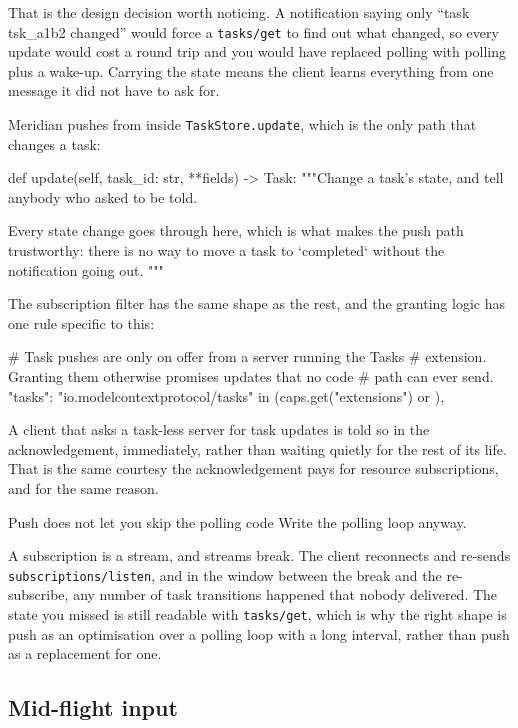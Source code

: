 That is the design decision worth noticing. A notification saying only ``task
tsk\_a1b2 changed'' would force a \texttt{tasks/get} to find out what changed,
so every update would cost a round trip and you would have replaced polling with
polling plus a wake-up. Carrying the state means the client learns everything
from one message it did not have to ask for.

Meridian pushes from inside \texttt{TaskStore.update}, which is the only path
that changes a task:

\begin{py}
def update(self, task_id: str, **fields) -> Task:
    """Change a task's state, and tell anybody who asked to be told.

    Every state change goes through here, which is what makes the push
    path trustworthy: there is no way to move a task to `completed` without
    the notification going out.
    """
\end{py}

The subscription filter has the same shape as the rest, and the granting logic
has one rule specific to this:

\begin{py}
# Task pushes are only on offer from a server running the Tasks
# extension. Granting them otherwise promises updates that no code
# path can ever send.
"tasks": "io.modelcontextprotocol/tasks" in (caps.get("extensions") or {}),
\end{py}

A client that asks a task-less server for task updates is told so in the
acknowledgement, immediately, rather than waiting quietly for the rest of its
life. That is the same courtesy the acknowledgement pays for resource
subscriptions, and for the same reason.

\begin{notebox}{Push does not let you skip the polling code}
Write the polling loop anyway.

A subscription is a stream, and streams break. The client reconnects and
re-sends \texttt{subscriptions/listen}, and in the window between the break and
the re-subscribe, any number of task transitions happened that nobody delivered.
The state you missed is still readable with \texttt{tasks/get}, which is why the
right shape is push as an optimisation over a polling loop with a long interval,
rather than push as a replacement for one.
\end{notebox}

\subsection{Mid-flight input}

